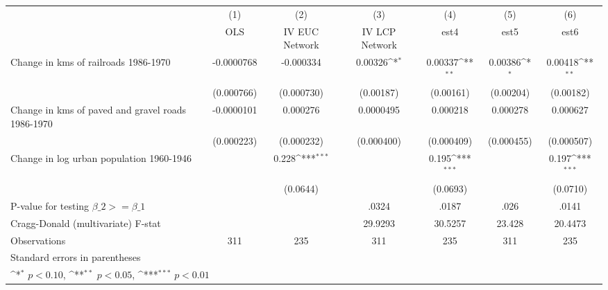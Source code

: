 {
\def\sym#1{\ifmmode^{#1}\else\(^{#1}\)\fi}
\begin{tabular}{l*{6}{c}}
\hline\hline
                &\multicolumn{1}{c}{(1)}&\multicolumn{1}{c}{(2)}&\multicolumn{1}{c}{(3)}&\multicolumn{1}{c}{(4)}&\multicolumn{1}{c}{(5)}&\multicolumn{1}{c}{(6)}\\
                &\multicolumn{1}{c}{OLS}&\multicolumn{1}{c}{IV EUC Network}&\multicolumn{1}{c}{IV LCP Network}&\multicolumn{1}{c}{est4}&\multicolumn{1}{c}{est5}&\multicolumn{1}{c}{est6}\\
\hline
Change in kms of railroads 1986-1970&-0.0000768         &-0.000334         &  0.00326\sym{*}  &  0.00337\sym{**} &  0.00386\sym{*}  &  0.00418\sym{**} \\
                &(0.000766)         &(0.000730)         &(0.00187)         &(0.00161)         &(0.00204)         &(0.00182)         \\
[1em]
Change in kms of paved and gravel roads 1986-1970&-0.0000101         & 0.000276         &0.0000495         & 0.000218         & 0.000278         & 0.000627         \\
                &(0.000223)         &(0.000232)         &(0.000400)         &(0.000409)         &(0.000455)         &(0.000507)         \\
[1em]
Change in log urban population 1960-1946&                  &    0.228\sym{***}&                  &    0.195\sym{***}&                  &    0.197\sym{***}\\
                &                  & (0.0644)         &                  & (0.0693)         &                  & (0.0710)         \\
\hline
P-value for testing $\beta\_{2} >= \beta\_{1}$&                  &                  &    .0324         &    .0187         &     .026         &    .0141         \\
Cragg-Donald (multivariate) F-stat&                  &                  &  29.9293         &  30.5257         &   23.428         &  20.4473         \\
Observations    &      311         &      235         &      311         &      235         &      311         &      235         \\
\hline\hline
\multicolumn{7}{l}{\footnotesize Standard errors in parentheses}\\
\multicolumn{7}{l}{\footnotesize \sym{*} \(p<0.10\), \sym{**} \(p<0.05\), \sym{***} \(p<0.01\)}\\
\end{tabular}
}
